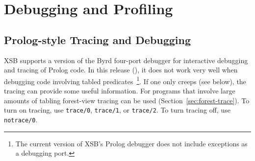\chapter{Debugging and Profiling} \label{debugging}
\section{Prolog-style Tracing and Debugging}
 
%
XSB supports a version of the Byrd four-port debugger for interactive
debugging and tracing of Prolog code.  In this release (\version), it
does not work very well when debugging code involving tabled
predicates~\footnote{The current version of XSB's Prolog debugger does
  not include exceptions as a debugging port.}.  If one only creeps
(see below), the tracing can provide some useful information.  For
programs that involve large amounts of tabling forest-view tracing can
be used (Section~\ref{sec:forest-trace}).
To turn on tracing, use {\tt trace/0}, {\tt trace/1}, or {\tt trace/2}.  To
turn tracing off, use {\tt notrace/0}.

